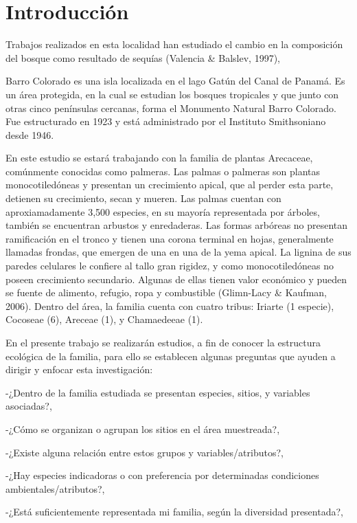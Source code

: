 \documentclass[11pt,]{article}
\begin{document}
\noindent  \section{Introducción}\label{introducciuxf3n}

Trabajos realizados en esta localidad han estudiado el cambio en la
composición del bosque como resultado de sequías (Valencia \& Balslev,
1997),

Barro Colorado es una isla localizada en el lago Gatún del Canal de
Panamá. Es un área protegida, en la cual se estudian los bosques
tropicales y que junto con otras cinco penínsulas cercanas, forma el
Monumento Natural Barro Colorado. Fue estructurado en 1923 y está
administrado por el Instituto Smithsoniano desde 1946.

En este estudio se estará trabajando con la familia de plantas
Arecaceae, comúnmente conocidas como palmeras. Las palmas o palmeras son
plantas monocotiledóneas y presentan un crecimiento apical, que al
perder esta parte, detienen su crecimiento, secan y mueren. Las palmas
cuentan con aproxiamadamente 3,500 especies, en su mayoría representada
por árboles, también se encuentran arbustos y enredaderas. Las formas
arbóreas no presentan ramificación en el tronco y tienen una corona
terminal en hojas, generalmente llamadas frondas, que emergen de una en
una de la yema apical. La lignina de sus paredes celulares le confiere
al tallo gran rigidez, y como monocotiledóneas no poseen crecimiento
secundario. Algunas de ellas tienen valor económico y pueden se fuente
de alimento, refugio, ropa y combustible (Glimn-Lacy \& Kaufman, 2006).
Dentro del área, la familia cuenta con cuatro tribus: Iriarte (1
especie), Cocoseae (6), Areceae (1), y Chamaedeeae (1).

En el presente trabajo se realizarán estudios, a fin de conocer la
estructura ecológica de la familia, para ello se establecen algunas
preguntas que ayuden a dirigir y enfocar esta investigación:

-¿Dentro de la familia estudiada se presentan especies, sitios, y
variables asociadas?,

-¿Cómo se organizan o agrupan los sitios en el área muestreada?,

-¿Existe alguna relación entre estos grupos y variables/atributos?,

-¿Hay especies indicadoras o con preferencia por determinadas
condiciones ambientales/atributos?,

-¿Está suficientemente representada mi familia, según la diversidad
presentada?,
\end{document}
